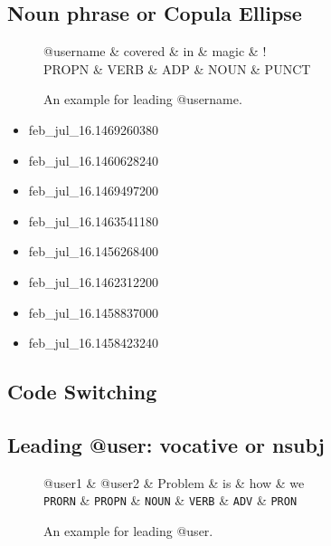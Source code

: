 \documentclass[11pt,a4paper]{article}
\begin{document}
\subsection{Noun phrase or Copula Ellipse}
\begin{figure}[t]
	\centering
	\small
	\begin{dependency}[edge slant=2, text only label, label style=above]
		\begin{deptext}
			@username \& covered \& in \& magic \& ! \\
			PROPN \& VERB \& ADP \& NOUN \& PUNCT \\
		\end{deptext}
	\end{dependency}
	\caption{An example for leading @username.}\label{fig:case-05-1}
\end{figure}

\begin{itemize}
	\item feb\_jul\_16.1469260380
	\item feb\_jul\_16.1460628240
	\item feb\_jul\_16.1469497200
	\item feb\_jul\_16.1463541180
	\item feb\_jul\_16.1456268400
	\item feb\_jul\_16.1462312200
	\item feb\_jul\_16.1458837000
	\item feb\_jul\_16.1458423240
\end{itemize}

\subsection{Code Switching}

\subsection{Leading @user: vocative or nsubj}
\begin{figure}[t]
	\centering
	\small
	\begin{dependency}[edge slant=2, text only label, label style=above]
		\begin{deptext}
			@user1  \& @user2 \& Problem \& is \& how \& we \\
			\texttt{PRORN} \& \texttt{PROPN} \& \texttt{NOUN} \& \texttt{VERB} \& \texttt{ADV} \& \texttt{PRON} \\
		\end{deptext}
	\end{dependency}
	\caption{An example for leading @user.}\label{fig:vocative}
\end{figure}
\end{document}
